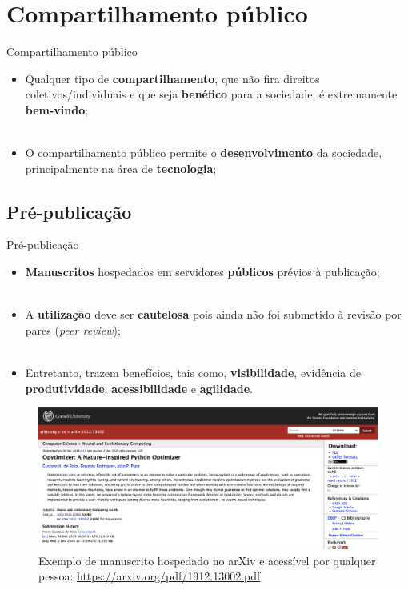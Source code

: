 \section{Compartilhamento público}
\label{s.public_sharing}

\begin{frame}{Compartilhamento público}
	\justify
	\begin{itemize}
		\item<1> Qualquer tipo de \textbf{compartilhamento}, que não fira direitos coletivos/individuais e que seja \textbf{benéfico} para a sociedade, é extremamente \textbf{bem-vindo};
		\\~\\
		\item<2> O compartilhamento público permite o \textbf{desenvolvimento} da sociedade, principalmente na área de \textbf{tecnologia};
	\end{itemize}
\end{frame}

\subsection{Pré-publicação}
\label{ss.preprint}

\begin{frame}{Pré-publicação}
	\justify
	\begin{itemize}
		\item<1> \textbf{Manuscritos} hospedados em servidores \textbf{públicos} prévios à publicação;
		\\~\\
		\item<2> A \textbf{utilização} deve ser \textbf{cautelosa} pois ainda não foi submetido à revisão por pares (\emph{peer review});
		\\~\\
		\item<3> Entretanto, trazem benefícios, tais como, \textbf{visibilidade}, evidência de \textbf{produtividade}, \textbf{acessibilidade} e \textbf{agilidade}.
	\end{itemize}
\end{frame}

\begin{frame}{}
	\begin{figure}
		\centering
		\includegraphics[scale=0.215]{figs/arxiv_paper.png}
		\caption{Exemplo de  manuscrito hospedado no arXiv e acessível por qualquer pessoa: \url{https://arxiv.org/pdf/1912.13002.pdf}.}
		\label{f.arxiv_paper}
	\end{figure}
\end{frame}


